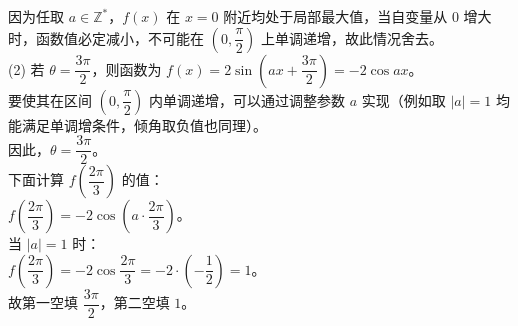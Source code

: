 {  因为任取 \(a \in \mathbb{Z}^*\)，\(f(x)\) 在 \(x = 0\) 附近均处于局部最大值，当自变量从 \(0\) 增大时，函数值必定减小，不可能在 \(\left(0, \dfrac{\pi}{2}\right)\) 上单调递增，故此情况舍去。\\
  (2) 若 \(\theta = \dfrac{3\pi}{2}\)，则函数为 \(f(x) = 2\sin\left(ax + \dfrac{3\pi}{2}\right) = -2\cos ax\)。\\
  要使其在区间 \(\left(0, \dfrac{\pi}{2}\right)\) 内单调递增，可以通过调整参数 \(a\) 实现（例如取 \(|a| = 1\) 均能满足单调增条件，倾角取负值也同理）。\\
  因此，\(\theta = \dfrac{3\pi}{2}\)。\\
  下面计算 \(f\left(\dfrac{2\pi}{3}\right)\) 的值：\\
  \(f\left(\dfrac{2\pi}{3}\right) = -2\cos\left(a \cdot \dfrac{2\pi}{3}\right)\)。\\
  当 \(|a| = 1\) 时：\\
  \(f\left(\dfrac{2\pi}{3}\right) = -2\cos\dfrac{2\pi}{3} = -2 \cdot \left(-\dfrac{1}{2}\right) = 1\)。\\
  故第一空填 \(\dfrac{3\pi}{2}\)，第二空填 \(1\)。%
}

\newcommand{\qTrigEvenMonotonicDiagnosis}{%
  学生容易根据奇偶性得出 \(\theta = \dfrac{\pi}{2}\) 或 \(\dfrac{3\pi}{2}\) 之后，无法继续利用“单调递增”排除错误的分支。理解 \(\cos ax\) 在 0 点附近的极大值特征是排除 \(\theta = \dfrac{\pi}{2}\) 的简捷途径。%
}

\newcommand{\qTrigEvenMonotonicTeachingNotes}{%
  此题考查三角函数的图像变换。讲评时应梳理正弦偶函数的形式特征——即相位 \(\theta\) 必取 \(\dfrac{\pi}{2} + k\pi\)。在做单调性排查时，可指导学生代入 \(a=1\) 画出余弦曲线的示意图，辅助建立数形结合的直觉。%
}
